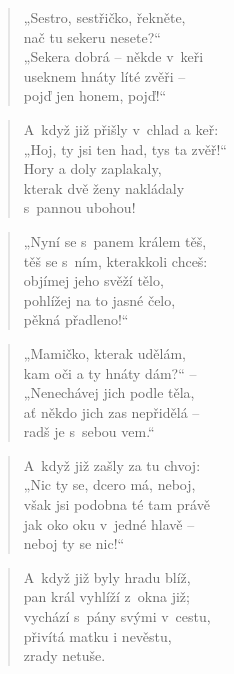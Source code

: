 \begin{verse}
„Sestro, sestřičko, řekněte, \\
nač tu sekeru nesete?“ \\
„Sekera dobrá -- někde v~keři \\
useknem hnáty líté zvěři -- \\
pojď jen honem, pojď!“
\end{verse}

\begin{verse}
A~když již přišly v~chlad a keř: \\
„Hoj, ty jsi ten had, tys ta zvěř!“ \\
Hory a doly zaplakaly, \\
kterak dvě ženy nakládaly \\
s~pannou ubohou!
\end{verse}

\begin{verse}
„Nyní se s~panem králem těš, \\
těš se s~ním, kterakkoli chceš: \\
objímej jeho svěží tělo, \\
pohlížej na to jasné čelo, \\
pěkná přadleno!“
\end{verse}

\begin{verse}
„Mamičko, kterak udělám, \\
kam oči a ty hnáty dám?“ -- \\
„Nenechávej jich podle těla, \\
ať někdo jich zas nepřidělá -- \\
radš je s~sebou vem.“
\end{verse}

\begin{verse}
A~když již zašly za tu chvoj: \\
„Nic ty se, dcero má, neboj, \\
však jsi podobna té tam právě \\
jak oko oku v~jedné hlavě -- \\
neboj ty se nic!“
\end{verse}

\begin{verse}
A~když již byly hradu blíž, \\
pan král vyhlíží z~okna již; \\
vychází s~pány svými v~cestu, \\
přivítá matku i nevěstu, \\
zrady netuše.
\end{verse}

